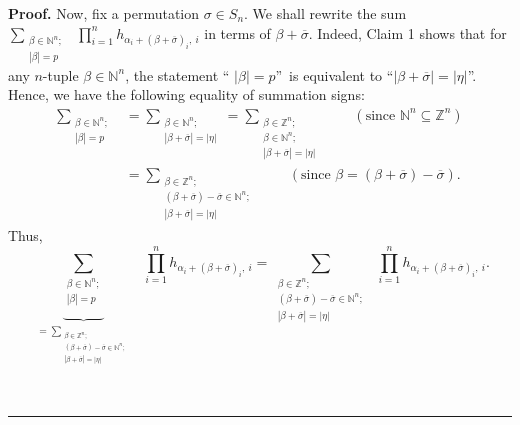 \documentclass[numbers=enddot,12pt,final,onecolumn,notitlepage,english]{scrartcl}%
\theoremstyle{definition}
\newenvironment{proof}[1][Proof]{\noindent\textbf{#1.} }{\ \rule{0.5em}{0.5em}}
\let\sumnonlimits\sum
\let\prodnonlimits\prod
\renewcommand{\sum}{\sumnonlimits\limits}
\renewcommand{\prod}{\prodnonlimits\limits}
\newenvironment{verlong}{}{}
\begin{document}
\begin{verlong}
\begin{proof}
Now, fix a permutation $\sigma\in S_{n}$. We shall rewrite the sum
$\sum_{\substack{\beta\in\mathbb{N}^{n};\\\left\vert \beta\right\vert
=p}}\ \ \prod_{i=1}^{n}h_{\alpha_{i}+\left(  \beta+\overline{\sigma}\right)
_{i},\ i}$ in terms of $\beta+\overline{\sigma}$. Indeed, Claim 1 shows that
for any $n$-tuple $\beta\in\mathbb{N}^{n}$, the statement \textquotedblleft%
$\left\vert \beta\right\vert =p$\textquotedblright\ is equivalent to
\textquotedblleft$\left\vert \beta+\overline{\sigma}\right\vert =\left\vert
\eta\right\vert $\textquotedblright. Hence, we have the following equality of
summation signs:%
\begin{align*}
\sum_{\substack{\beta\in\mathbb{N}^{n};\\\left\vert \beta\right\vert =p}}  &
=\sum_{\substack{\beta\in\mathbb{N}^{n};\\\left\vert \beta+\overline{\sigma
}\right\vert =\left\vert \eta\right\vert }}=\sum_{\substack{\beta\in
\mathbb{Z}^{n};\\\beta\in\mathbb{N}^{n};\\\left\vert \beta+\overline{\sigma
}\right\vert =\left\vert \eta\right\vert }}\ \ \ \ \ \ \ \ \ \ \left(
\text{since }\mathbb{N}^{n}\subseteq\mathbb{Z}^{n}\right) \\
&  =\sum_{\substack{\beta\in\mathbb{Z}^{n};\\\left(  \beta+\overline{\sigma
}\right)  -\overline{\sigma}\in\mathbb{N}^{n};\\\left\vert \beta
+\overline{\sigma}\right\vert =\left\vert \eta\right\vert }%
}\ \ \ \ \ \ \ \ \ \ \left(  \text{since }\beta=\left(  \beta+\overline
{\sigma}\right)  -\overline{\sigma}\right)  .
\end{align*}
Thus,%
\[
\underbrace{\sum_{\substack{\beta\in\mathbb{N}^{n};\\\left\vert \beta
\right\vert =p}}}_{\substack{=\sum_{\substack{\beta\in\mathbb{Z}^{n};\\\left(
\beta+\overline{\sigma}\right)  -\overline{\sigma}\in\mathbb{N}^{n}%
;\\\left\vert \beta+\overline{\sigma}\right\vert =\left\vert \eta\right\vert
}}}}\ \ \prod_{i=1}^{n}h_{\alpha_{i}+\left(  \beta+\overline{\sigma}\right)
_{i},\ i}=\sum_{\substack{\beta\in\mathbb{Z}^{n};\\\left(  \beta
+\overline{\sigma}\right)  -\overline{\sigma}\in\mathbb{N}^{n};\\\left\vert
\beta+\overline{\sigma}\right\vert =\left\vert \eta\right\vert }%
}\ \ \prod_{i=1}^{n}h_{\alpha_{i}+\left(  \beta+\overline{\sigma}\right)
_{i},\ i}.
\]



\end{proof}
\end{verlong}
\end{document}
